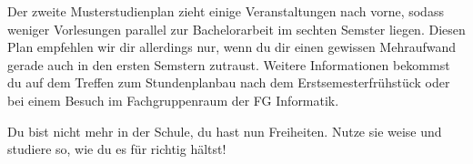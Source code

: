 Der zweite Musterstudienplan zieht einige Veranstaltungen nach vorne, sodass weniger Vorlesungen parallel zur Bachelorarbeit im sechten Semster liegen. Diesen Plan empfehlen wir dir allerdings nur, wenn du dir einen gewissen Mehraufwand gerade auch in den ersten Semstern zutraust. Weitere Informationen bekommst du auf dem Treffen zum Stundenplanbau nach dem Erstsemesterfrühstück oder bei einem Besuch im Fachgruppenraum der FG Informatik.






Du bist nicht mehr in der Schule, du hast nun Freiheiten. Nutze sie weise und studiere so, wie du es für richtig hältst!
